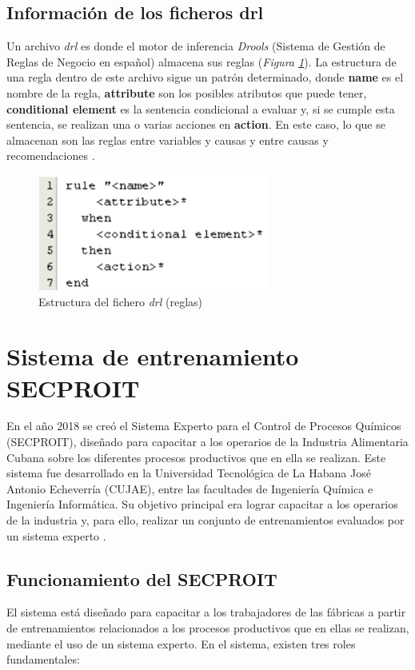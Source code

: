 \subsection{Información de los ficheros drl}
Un archivo \textsl{drl} es donde el motor de inferencia \textsl{Drools} (Sistema de Gestión de Reglas de Negocio en español) almacena sus reglas (\textsl{Figura \ref{fig:reglas}}). La estructura de una regla dentro de este archivo sigue un patrón determinado, donde \textbf{name} es el nombre de la regla, \textbf{attribute} son los posibles atributos que puede tener, \textbf{conditional element} es la sentencia condicional a evaluar y, si se cumple esta sentencia, se realizan una o varias acciones en \textbf{action}. En este caso, lo que se almacenan son  las reglas entre variables y causas y entre causas y recomendaciones \cite{Riveron2017}.

\begin{figure}[h]
\centering
 \includegraphics[width=0.47\linewidth]{imagen/rules.png}
 \caption{Estructura del fichero \textsl{drl} (reglas)}
 \label{fig:reglas} 
\end{figure}


\section{Sistema de entrenamiento SECPROIT}
En el año 2018 se creó el Sistema Experto para el Control de Procesos Químicos (SECPROIT), diseñado para capacitar a los operarios de la Industria Alimentaria Cubana sobre los diferentes procesos productivos que en ella se realizan. Este sistema fue desarrollado en la Universidad Tecnológica de La Habana José Antonio Echeverría (CUJAE), entre las facultades de Ingeniería Química e Ingeniería Informática. Su objetivo principal era lograr capacitar a los operarios de la industria y, para ello, realizar un conjunto de entrenamientos evaluados por un sistema experto \cite{ElenaAcostaGil2018}.

\subsection{Funcionamiento del SECPROIT}
El sistema está diseñado para capacitar a los trabajadores de las fábricas a partir de entrenamientos relacionados a los procesos productivos que en ellas se realizan, mediante el uso de un sistema experto. En el sistema, existen tres roles fundamentales: 

